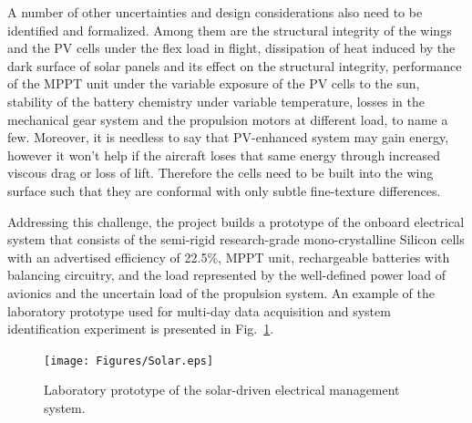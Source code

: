 \documentclass{ifacconf}
\begin{document}
A number of other uncertainties and design considerations also need to be
identified and formalized. Among them are the structural integrity of the
wings and the PV cells under the flex load in flight, dissipation of heat
induced by the dark surface of solar panels and its effect on the structural
integrity,  performance of the MPPT unit under the variable exposure of the
PV cells to the sun, stability of the battery chemistry under variable
temperature, losses in the mechanical gear system and the propulsion motors
at different load, to name a few. Moreover, it is needless to say that
PV-enhanced system may gain energy, however it won't help if the aircraft
loses that same energy through increased viscous drag or loss of lift.
Therefore the cells need to be built into the wing surface such that they are
conformal with only subtle fine-texture differences.
%

Addressing this challenge, the project builds a prototype of the onboard
electrical system that consists of the semi-rigid research-grade mono-crystalline
Silicon cells with an advertised efficiency of 22.5$\%$, MPPT unit,
rechargeable batteries with balancing circuitry, and the load represented by
the well-defined power load of avionics and the uncertain load of the
propulsion system. An example of the laboratory prototype used for multi-day
data acquisition and system identification experiment is presented in
Fig.~\ref{fig:Solar_arch}.

\begin{figure}[thpb]
  \centering
  \texttt{[image: Figures/Solar.eps]}
  \caption{Laboratory prototype of the solar-driven electrical management system.}
  \label{fig:Solar_arch}
\end{figure}
\end{document}
